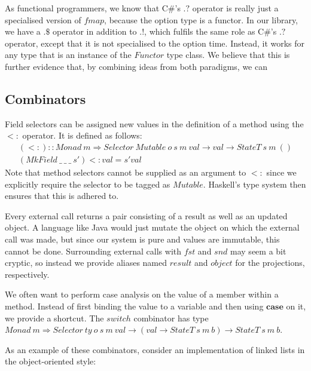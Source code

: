 As functional programmers, we know that C\#'s $.?$ operator is really just a specialised version of $\mathit{fmap}$, because the option type is a functor. In our library, we have a $.\$$ operator in addition to $.!$, which fulfils the same role as C\#'s $.?$ operator, except that it is not specialised to the option time. Instead, it works for any type that is an instance of the $\mathit{Functor}$ type class. We believe that this is further evidence that, by combining ideas from both paradigms, we can 

\subsection{Combinators}

Field selectors can be assigned new values in the definition of a method using the $<:$ operator. It is defined as follows: 
\begin{displaymath}
\begin{array}{l}
(<:)  ::  \mathit{Monad}~m \Rightarrow \mathit{Selector}~\mathit{Mutable}~o~s~m~\mathit{val} \to \mathit{val} \to \mathit{StateT}~s~m~()\\
(\mathit{MkField}~\_~\_~\_~s') <: val  =  s' val
\end{array}
\end{displaymath}
Note that method selectors cannot be supplied as an argument to $<:$ since we explicitly require the selector to be tagged as $\mathit{Mutable}$. Haskell's type system then ensures that this is adhered to.

Every external call returns a pair consisting of a result as well as an updated object. A language like Java would just mutate the object on which the external call was made, but since our system is pure and values are immutable, this cannot be done. Surrounding external calls with $\mathit{fst}$ and $\mathit{snd}$ may seem a bit cryptic, so instead we provide aliases named $\mathit{result}$ and $\mathit{object}$ for the projections, respectively. 

We often want to perform case analysis on the value of a member within a method. Instead of first binding the value to a variable and then using $\mathbf{case}$ on it, we provide a shortcut. The $\mathit{switch}$ combinator has type $\mathit{Monad}~m \Rightarrow \mathit{Selector}~\mathit{ty}~o~s~m~\mathit{val} \to (\mathit{val} \to \mathit{StateT}~s~m~b) \to \mathit{StateT}~s~m~b$.

As an example of these combinators, consider an implementation of linked lists in the object-oriented style:

